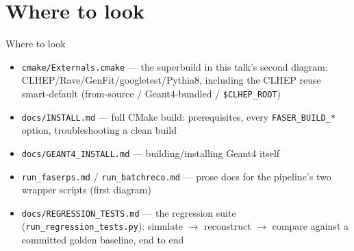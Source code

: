 \documentclass[aspectratio=169]{beamer}
\begin{document}
\section{Where to look}

\begin{frame}{Where to look}
  \begin{itemize}
    \item \texttt{cmake/Externals.cmake} --- the superbuild in this talk's
      second diagram: CLHEP/Rave/GenFit/googletest/Pythia8, including the
      CLHEP reuse smart-default (from-source / Geant4-bundled /
      \texttt{\$CLHEP\_ROOT})
    \item \texttt{docs/INSTALL.md} --- full CMake build: prerequisites,
      every \texttt{FASER\_BUILD\_*} option, troubleshooting a clean build
    \item \texttt{docs/GEANT4\_INSTALL.md} --- building/installing Geant4
      itself
    \item \texttt{run\_faserps.md} / \texttt{run\_batchreco.md} --- prose
      docs for the pipeline's two wrapper scripts (first diagram)
    \item \texttt{docs/REGRESSION\_TESTS.md} --- the regression suite
      (\texttt{run\_regression\_tests.py}): simulate $\to$ reconstruct
      $\to$ compare against a committed golden baseline, end to end
  \end{itemize}
\end{frame}
\end{document}
